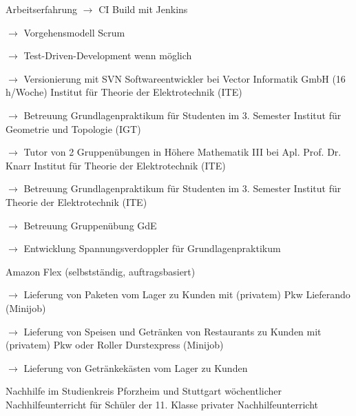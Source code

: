 \begin{rubric}{\textcolor{black!20!blue!100}{Arbeitserfahrung}}
			$\rightarrow$ CI Build mit Jenkins
			
			$\rightarrow$ Vorgehensmodell Scrum
			
			$\rightarrow$ Test-Driven-Development wenn möglich
			
			$\rightarrow$ Versionierung mit SVN
		\entry*[05/2016 --- 10/2017]
			Softwareentwickler bei Vector Informatik GmbH (16\,h/Woche)
		\entry*[10/2015 --- 03/2016]
			Institut für Theorie der Elektrotechnik (ITE)
				
			\setlength{\hangindent}{\widthof{$\rightarrow$ }}
			$\rightarrow$ Betreuung Grundlagenpraktikum für Studenten im 3. Semester
		\entry*
			Institut für Geometrie und Topologie (IGT)
			
			\setlength{\hangindent}{\widthof{$\rightarrow$ }}
			$\rightarrow$ Tutor von 2 Gruppenübungen in Höhere Mathematik III bei Apl. Prof. Dr. Knarr
		\entry*[10/2014 --- 03/2015]
			Institut für Theorie der Elektrotechnik (ITE)
			
			\setlength{\hangindent}{\widthof{$\rightarrow$ }}
			$\rightarrow$ Betreuung Grundlagenpraktikum für Studenten im 3. Semester
		\entry*[10/2013 --- 03/2014]
			Institut für Theorie der Elektrotechnik (ITE)
			
			\setlength{\hangindent}{\widthof{$\rightarrow$ }}
			$\rightarrow$ Betreuung Gruppenübung GdE
			
			$\rightarrow$ Entwicklung Spannungsverdoppler für Grundlagenpraktikum
	
		\entry*[09/11/2020 --- 06/2022]
			Amazon Flex (selbstständig, auftragsbasiert)
			
			\setlength{\hangindent}{\widthof{$\rightarrow$ }}
			$\rightarrow$ Lieferung von Paketen vom Lager zu Kunden mit (privatem) Pkw
		\entry*[24/10/2020 --- 04/01/2021]
			Lieferando (Minijob)
			
			\setlength{\hangindent}{\widthof{$\rightarrow$ }}
			$\rightarrow$ Lieferung von Speisen und Getränken von Restaurants zu Kunden mit (privatem) Pkw oder Roller
		\entry*[17/07/2020 --- 18/10/2020]
			Durstexpress (Minijob)
			
			\setlength{\hangindent}{\widthof{$\rightarrow$ }}
			$\rightarrow$ Lieferung von Getränkekästen vom Lager zu Kunden
				
		\entry*[10/2015 --- 01/2016]
			Nachhilfe im Studienkreis Pforzheim und Stuttgart
		\entry*[10/2011 --- 06/2012]
			wöchentlicher Nachhilfeunterricht für Schüler der 11. Klasse
		\entry*[\phantom{10/}2010 --- 2016]
			privater Nachhilfeunterricht
			

\end{rubric}
